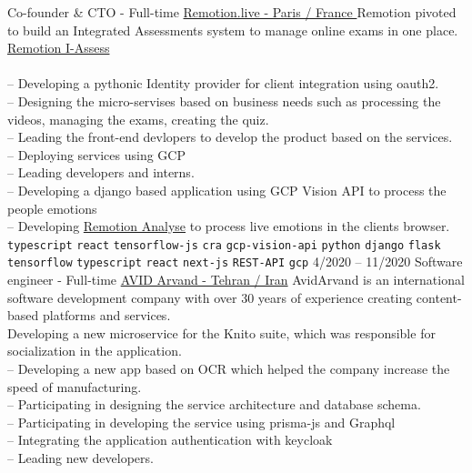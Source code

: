 \documentclass[9pt]{developercv}
\begin{document}
\begin{entrylist}
	{Co-founder \& CTO - Full-time}
	{\href{https://remotion.live/}{Remotion.live - Paris / France }}
	{Remotion pivoted to build an Integrated Assessments system to manage online exams in one place.
		\href{https://remotion.live/} {Remotion I-Assess} \\\\
		-- Developing a pythonic Identity provider for client integration using oauth2. \\
		-- Designing the micro-servises based on business needs such as processing the videos, managing the exams, creating the quiz. \\
		-- Leading the front-end devlopers to develop the product based on the services. \\
		-- Deploying services using GCP \\
		-- Leading developers and interns. \\
		-- Developing a django based application using GCP Vision API to process the people emotions \\
		-- Developing \href{https://analyse.remotion.live/} {Remotion Analyse} to process live emotions in the clients browser. \\
		\texttt{typescript}\slashsep
		\texttt{react}\slashsep
		\texttt{tensorflow-js}\slashsep
		\texttt{cra}\slashsep
		\texttt{gcp-vision-api}\slashsep
		\texttt{python}\slashsep
		\texttt{django}\slashsep
		\texttt{flask}\slashsep
		\texttt{tensorflow}\slashsep
		\texttt{typescript}\slashsep
		\texttt{react}\slashsep
		\texttt{next-js}\slashsep
		\texttt{REST-API}\slashsep
		\texttt{gcp}\slashsep
	}
	\entry
	{4/2020 -- 11/2020}
	{Software engineer - Full-time}
	{
		\href{https://www.linkedin.com/company/avid-technology-development/}{AVID Arvand - Tehran / Iran}}
	{
		AvidArvand is an international software development company with over 30 years of experience creating content-based platforms and services. \\
		Developing a new microservice for the Knito suite, which was responsible for socialization in the application.\\
		-- Developing a new app based on OCR which helped
		the company increase the speed of manufacturing. \\
		-- Participating in designing the service architecture and database schema. \\
		-- Participating in developing the service using prisma-js and Graphql \\
		-- Integrating the application authentication with keycloak \\
		-- Leading new developers. \\
		
}
\end{entrylist}
\end{document}
